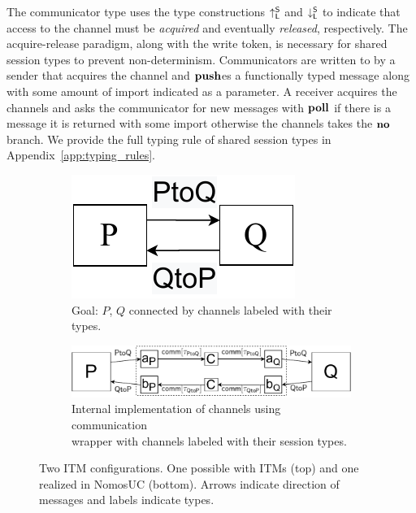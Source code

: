 The communicator type uses the type constructions $\uparrow^{\mathsf{S}}_{\mathsf{L}}$ and $\downarrow^{\mathsf{S}}_{\mathsf{L}}$ to indicate that 
access to the channel must be \emph{acquired} and eventually \emph{released}, respectively.
The acquire-release paradigm, along with the write token, is necessary for shared session types to prevent non-determinism.
Communicators are written to by a sender that acquires the channel and $\mathbf{push}$es a functionally 
typed message along with some amount of import indicated as a parameter. A receiver acquires the 
channels and asks the communicator for new messages with $\mathbf{poll}$ if there is a message it is returned with some import
otherwise the channels takes the $\mathbf{no}$ branch.
We provide the full typing rule of shared session types in Appendix~\ref{app:typing_rules}.
\begin{figure}
	\begin{subfigure}{0.5\textwidth}
	\begin{center}
	\includegraphics[scale=0.5]{figures/p_and_q.pdf}
	\caption{Goal: $P$, $Q$ connected by channels labeled with their types.}
	\label{fig:pandq}
	\end{center}
	\vspace{0.1em}
	\end{subfigure}
	\begin{subfigure}{0.5\textwidth}
	\begin{center}
	\includegraphics[scale=0.4]{figures/newPandQ.pdf}
	\caption{Internal implementation of channels using communication\\wrapper
	with channels labeled with their session types.}
	\label{fig:newpandq}
	\end{center}
	\end{subfigure}
	\caption{Two ITM configurations. One possible with ITMs (top) and one realized in NomosUC (bottom). Arrows indicate direction of messages
	and labels indicate types.}
	\vspace{-1em}
\end{figure}


